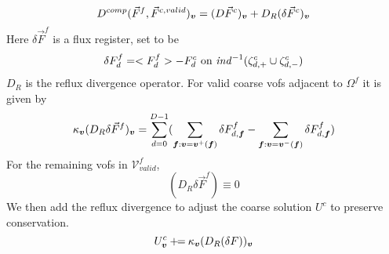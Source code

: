 \begin{equation}
 D^{comp}(\vec{F}^f, \vec{F}^{c, valid})_{\boldsymbol{v}} = (D \vec{F}^c)_{\boldsymbol{v}}
+ D_R(\delta \vec{F}^c)_{\boldsymbol{v}} 
\end{equation}
Here $\delta \vec{F}^f$ is a flux register, set to be
\begin{equation}
\delta F^f_d = <F^f_d> - F^c_d \mbox{   on } {\it ind}^{-1}(\zeta^c_{d, +}
\cup \zeta^c_{d, -}) 
\end{equation}
$D_R$ is the reflux divergence operator. For valid coarse vofs
adjacent to $\Omega^f$ it is given by 
\begin{equation}
\kappa_{\boldsymbol{v}}(D_R \delta \vec{F}^f)_{\boldsymbol{v}} = 
\sum\limits^{D-1}_{d=0}(
 \sum\limits_{{\boldsymbol{f}}:{\boldsymbol{v}}={\boldsymbol{v}}^+({\boldsymbol{f}})} \delta F^f_{d, {\boldsymbol{f}}} -
 \sum\limits_{{\boldsymbol{f}}:{\boldsymbol{v}}={\boldsymbol{v}}^-({\boldsymbol{f}})} \delta F^f_{d, {\boldsymbol{f}}})
\end{equation}
For the remaining vofs in $\mathcal{V}^f_{valid}$, 
\begin{equation}
(D_R \delta \vec{F}^f) \equiv 0
\end{equation}
We then add the reflux divergence
to adjust the coarse solution $U^c$ to preserve conservation.
\begin{equation}
U^c_{{\boldsymbol{v}}} \mathbin{+\mkern-7mu=}  \kappa_{{\boldsymbol{v}}} (D_R(\delta F))_{{\boldsymbol{v}}}
\end{equation}
